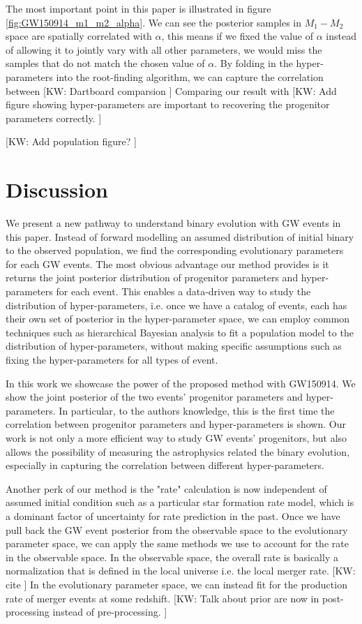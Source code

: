 \documentclass[twocolumn]{aastex631}
\newcommand{\kw}[1]{{\color{rb4}[KW: #1 ]}}
\begin{document}
The most important point in this paper is illustrated in figure \ref{fig:GW150914_m1_m2_alpha}.
We can see the posterior samples in $M_1-M_2$ space are spatially correlated with $\alpha$,
this means if we fixed the value of $\alpha$ instead of allowing it to jointly vary with all other parameters,
we would miss the samples that do not match the chosen value of $\alpha$.
By folding in the hyper-parameters into the root-finding algorithm,
we can capture the correlation between 
\kw{Dartboard comparsion} Comparing our result with 
\kw{Add figure showing hyper-parameters are important to recovering the progenitor parameters correctly.}

\kw{Add population figure?}

\section{Discussion}
\label{sec:discussion}


We present a new pathway to understand binary evolution with GW events in this paper.
Instead of forward modelling an assumed distribution of initial binary to the observed population,
we find the corresponding evolutionary parameters for each GW events. 
The most obvious advantage our method provides is it returns the joint posterior distribution of progenitor parameters and hyper-parameters for each event.
This enables a data-driven way to study the distribution of hyper-parameters,
i.e. once we have a catalog of events, each has their own set of posterior in the hyper-parameter space,
we can employ common techniques such as hierarchical Bayesian analysis to fit a population model to the distribution of hyper-parameters,
without making specific assumptions such as fixing the hyper-parameters for all types of event.
 
In this work we showcase the power of the proposed method with GW150914.
We show the joint posterior of the two events' progenitor parameters and hyper-parameters.
In particular, to the authors knowledge, this is the first time the correlation between progenitor parameters and hyper-parameters is shown.
Our work is not only a more efficient way to study GW events' progenitors,
but also allows the possibility of measuring the astrophysics related the binary evolution, especially in capturing the correlation between different hyper-parameters.

Another perk of our method is the "rate" calculation is now independent of assumed initial condition such as a particular star formation rate model,
which is a dominant factor of uncertainty for rate prediction in the past.
Once we have pull back the GW event posterior from the observable space to the evolutionary parameter space,
we can apply the same methods we use to account for the rate in the observable space.
In the observable space, the overall rate is basically a normalization that is defined in the local universe i.e. the local merger rate. \kw{cite}
In the evolutionary parameter space, we can instead fit for the production rate of merger events at some redshift.
\kw{Talk about prior are now in post-processing instead of pre-processing.}
\end{document}
